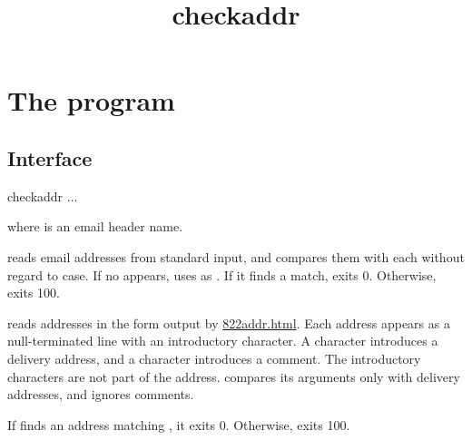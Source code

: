 \documentclass{book}
\title{checkaddr}
\begin{document}
\section{The  program}

\subsection{Interface}
\begin{code}%
  checkaddr  ...
\end{code}
where  is an email header name.

 reads email addresses from standard input,
and compares them with each  without regard to case.
If no  appears,  uses
 as .
If it finds a match,  exits 0.  Otherwise,
 exits 100.

 reads addresses in the form output by 
\href{\cmd{822addr}}{822addr.html}.  Each address appears
as a null-terminated line with an introductory character.
A \cmd{+} character introduces a
delivery address, and a \cmd{(} character introduces a comment.
The introductory characters are not part of the address.
 compares its arguments only with delivery
addresses, and ignores comments.

If  finds an address matching , it exits 0.
Otherwise,  exits 100.
\end{document}
